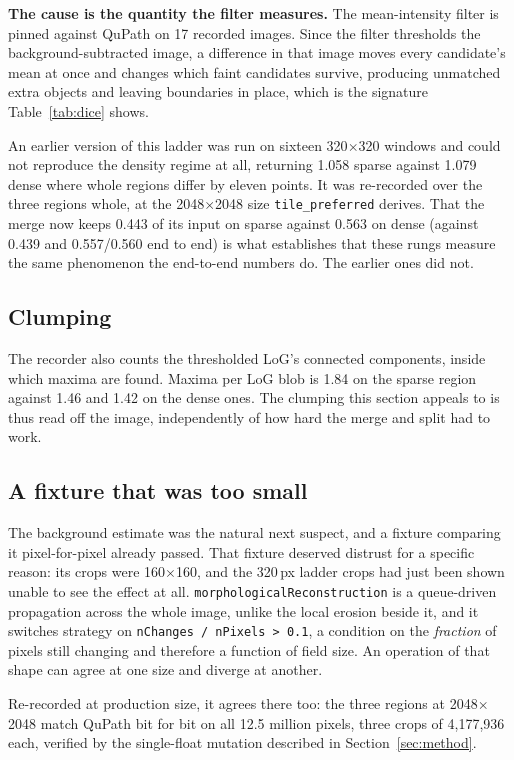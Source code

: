 \documentclass[11pt,a4paper]{article}
\begin{document}
\textbf{The cause is the quantity the filter measures.} The mean-intensity
filter is pinned against QuPath on 17 recorded images. Since the filter
thresholds the background-subtracted image, a difference in that image moves
every candidate's mean at once and changes which faint candidates survive,
producing unmatched extra objects and leaving boundaries in place, which is the
signature Table~\ref{tab:dice} shows.

An earlier version of this ladder was run on sixteen 320$\times$320 windows and
could not reproduce the density regime at all, returning 1.058 sparse against
1.079 dense where whole regions differ by eleven points. It was re-recorded
over the three regions whole, at the 2048$\times$2048 size
\texttt{tile\_preferred} derives. That the merge now keeps 0.443 of its input
on sparse against 0.563 on dense (against 0.439 and 0.557/0.560 end to end) is
what establishes that these rungs measure the same phenomenon the end-to-end
numbers do. The earlier ones did not.

\subsection{Clumping}

The recorder also counts the thresholded LoG's connected components, inside
which maxima are found. Maxima per LoG blob is 1.84 on the sparse region
against 1.46 and 1.42 on the dense ones. The clumping this section appeals to
is thus read off the image, independently of how hard the merge and split had
to work.

\subsection{A fixture that was too small}

The background estimate was the natural next suspect, and a fixture comparing
it pixel-for-pixel already passed. That fixture deserved distrust for a
specific reason: its crops were 160$\times$160, and the 320\,px ladder crops
had just been shown unable to see the effect at all.
\texttt{morphologicalReconstruction} is a queue-driven propagation across the
whole image, unlike the local erosion beside it, and it switches strategy on
\texttt{nChanges / nPixels > 0.1}, a condition on the \emph{fraction} of pixels
still changing and therefore a function of field size. An operation of that
shape can agree at one size and diverge at another.

Re-recorded at production size, it agrees there too: the three regions at
2048$\times$2048 match QuPath bit for bit on all 12.5 million pixels, three
crops of 4{,}177{,}936 each, verified by the single-float mutation described in
Section~\ref{sec:method}.
\end{document}
